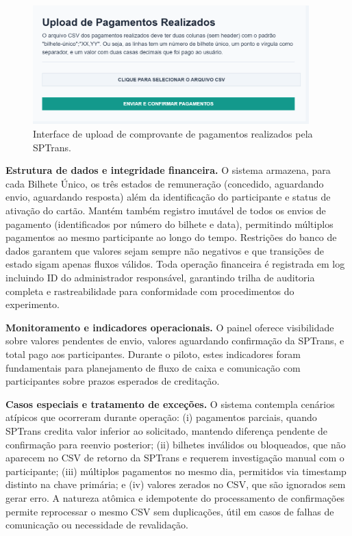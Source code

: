 \begin{figure}[H]
    \centering
    \includegraphics[width=0.95\textwidth]{figuras/remuneracao_processados.png}
    \caption{Interface de upload de comprovante de pagamentos realizados pela SPTrans.}
    \label{fig:remuneracao_gerar_csv_form_processados}
  \end{figure}
\textbf{Estrutura de dados e integridade financeira.} O sistema armazena, para cada Bilhete Único, os três estados de remuneração (concedido, aguardando envio, aguardando resposta) além da identificação do participante e status de ativação do cartão. Mantém também registro imutável de todos os envios de pagamento (identificados por número do bilhete e data), permitindo múltiplos pagamentos ao mesmo participante ao longo do tempo. Restrições do banco de dados garantem que valores sejam sempre não
negativos e que transições de estado sigam apenas fluxos
válidos. Toda operação financeira é registrada em log incluindo ID do administrador
responsável, garantindo trilha de auditoria completa e rastreabilidade para
conformidade com procedimentos do experimento.

\textbf{Monitoramento e indicadores operacionais.} O painel oferece visibilidade
sobre valores pendentes de envio, valores aguardando confirmação da SPTrans, e total pago aos participantes. 
Durante o piloto, estes indicadores foram fundamentais para
planejamento de fluxo de caixa e comunicação com participantes sobre prazos
esperados de creditação. 

\textbf{Casos especiais e tratamento de exceções.} O sistema contempla cenários
atípicos que ocorreram durante operação: (i) pagamentos parciais, quando SPTrans
credita valor inferior ao solicitado, mantendo diferença pendente de confirmação para reenvio posterior; (ii) bilhetes inválidos ou
bloqueados, que não aparecem no CSV de retorno da SPTrans e requerem investigação
manual com o participante; (iii) múltiplos pagamentos no mesmo dia, permitidos via
timestamp distinto na chave primária; e (iv) valores zerados no CSV, que são
ignorados sem gerar erro. A natureza atômica e idempotente do processamento de
confirmações permite reprocessar o mesmo CSV sem duplicações, útil em casos de
falhas de comunicação ou necessidade de revalidação.


